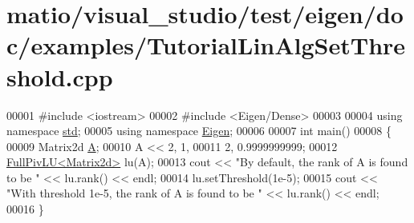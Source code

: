 \hypertarget{matio_2visual__studio_2test_2eigen_2doc_2examples_2_tutorial_lin_alg_set_threshold_8cpp_source}{}\section{matio/visual\+\_\+studio/test/eigen/doc/examples/\+Tutorial\+Lin\+Alg\+Set\+Threshold.cpp}
\label{matio_2visual__studio_2test_2eigen_2doc_2examples_2_tutorial_lin_alg_set_threshold_8cpp_source}

\begin{DoxyCode}
00001 \textcolor{preprocessor}{#include <iostream>}
00002 \textcolor{preprocessor}{#include <Eigen/Dense>}
00003 
00004 \textcolor{keyword}{using namespace }\hyperlink{namespacestd}{std};
00005 \textcolor{keyword}{using namespace }\hyperlink{namespace_eigen}{Eigen};
00006 
00007 \textcolor{keywordtype}{int} main()
00008 \{
00009    Matrix2d \hyperlink{group___core___module_class_eigen_1_1_matrix}{A};
00010    A << 2, 1,
00011         2, 0.9999999999;
00012    \hyperlink{group___l_u___module_class_eigen_1_1_full_piv_l_u}{FullPivLU<Matrix2d>} lu(A);
00013    cout << \textcolor{stringliteral}{"By default, the rank of A is found to be "} << lu.rank() << endl;
00014    lu.setThreshold(1e-5);
00015    cout << \textcolor{stringliteral}{"With threshold 1e-5, the rank of A is found to be "} << lu.rank() << endl;
00016 \}
\end{DoxyCode}
